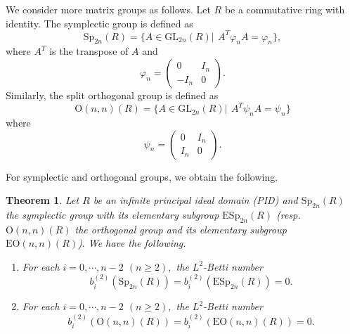 \documentclass{gtpart}     %
\newtheorem{theorem}{Theorem}[section]
\begin{document}
We consider more matrix groups as follows. Let $R$ be a commutative ring
with identity. The symplectic group is defined as
\begin{equation*}
\mathrm{Sp}_{2n}(R)=\{A\in \mathrm{GL}_{2n}(R)|\,\ A^{T}\varphi
_{n}A=\varphi _{n}\},
\end{equation*}%
where $A^{T}$ is the transpose of $A$ and
\begin{equation*}
\varphi _{n}=\left(
\begin{array}{cc}
0 & I_{n} \\
-I_{n} & 0%
\end{array}%
\right) .
\end{equation*}%
Similarly, the split orthogonal group is defined as
\begin{equation*}
\mathrm{O}(n,n)(R)=\{A\in \mathrm{GL}_{2n}(R)|\,\ A^{T}\psi _{n}A=\psi _{n}\}
\end{equation*}%
where%
\begin{equation*}
\psi _{n}=\left(
\begin{array}{cc}
0 & I_{n} \\
I_{n} & 0%
\end{array}%
\right) .
\end{equation*}

For symplectic and orthogonal groups, we obtain the following.

\begin{theorem}
\label{main2}Let $R$ be an infinite principal ideal domain (PID) and $%
\mathrm{Sp}_{2n}(R)$ the symplectic group with its elementary subgroup $%
\mathrm{ESp}_{2n}(R)$ (resp. $\mathrm{O}(n,n)(R)$ the orthogonal group and
its elementary subgroup $\mathrm{EO}(n,n)(R)$)$.$ We have the following.

\begin{enumerate}
\item[(i)] For each $i=0,\cdots ,n-2$ $(n\geq 2),$ the $L^{2}$-Betti number
\begin{equation*}
b_{i}^{(2)}(\mathrm{Sp}_{2n}(R))=b_{i}^{(2)}(\mathrm{ESp}_{2n}(R))=0.
\end{equation*}

\item[(ii)] For each $i=0,\cdots ,n-2$ $(n\geq 2),$ the $L^{2}$-Betti number
\begin{equation*}
b_{i}^{(2)}(\mathrm{O}(n,n)(R))=b_{i}^{(2)}(\mathrm{EO}(n,n)(R))=0.
\end{equation*}
\end{enumerate}
\end{theorem}
\end{document}
